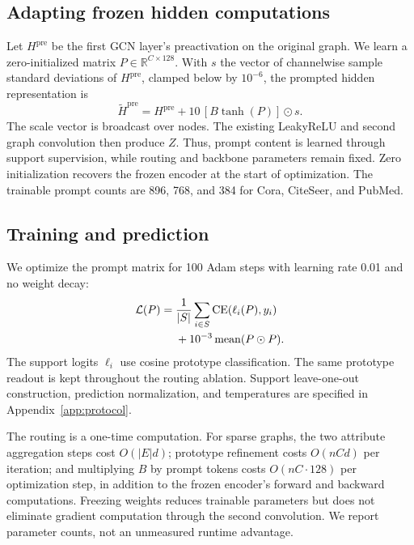 \subsection{Adapting frozen hidden computations}
Let $H^{\mathrm{pre}}$ be the first GCN layer's preactivation on the original graph. We learn a zero-initialized matrix $P\in\mathbb R^{C\times128}$. With $s$ the vector of channelwise sample standard deviations of $H^{\mathrm{pre}}$, clamped below by $10^{-6}$, the prompted hidden representation is
\begin{equation}
\widetilde H^{\mathrm{pre}}=H^{\mathrm{pre}}+10\,[B\tanh(P)]\odot s.
\label{eq:injection}
\end{equation}
The scale vector is broadcast over nodes. The existing LeakyReLU and second graph convolution then produce $Z$. Thus, prompt content is learned through support supervision, while routing and backbone parameters remain fixed. Zero initialization recovers the frozen encoder at the start of optimization. The trainable prompt counts are 896, 768, and 384 for Cora, CiteSeer, and PubMed.

\subsection{Training and prediction}
We optimize the prompt matrix for 100 Adam steps with learning rate 0.01 and no weight decay:
\begin{equation}
\begin{aligned}
\mathcal L(P)={}&\frac{1}{|S|}\sum_{i\in S}\operatorname{CE}(\ell_i(P),y_i)\\
&+10^{-3}\operatorname{mean}(P\odot P).
\end{aligned}
\label{eq:loss}
\end{equation}
The support logits $\ell_i$ use cosine prototype classification. The same prototype readout is kept throughout the routing ablation. Support leave-one-out construction, prediction normalization, and temperatures are specified in Appendix~\ref{app:protocol}.

The routing is a one-time computation. For sparse graphs, the two attribute aggregation steps cost $O(|E|d)$; prototype refinement costs $O(nCd)$ per iteration; and multiplying $B$ by prompt tokens costs $O(nC\cdot128)$ per optimization step, in addition to the frozen encoder's forward and backward computations. Freezing weights reduces trainable parameters but does not eliminate gradient computation through the second convolution. We report parameter counts, not an unmeasured runtime advantage.

